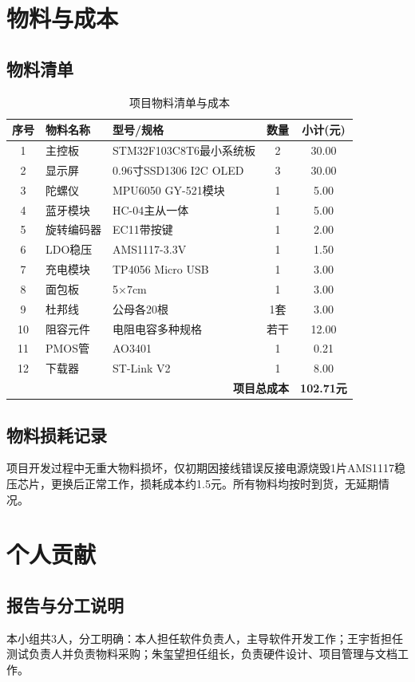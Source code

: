 \documentclass[12pt, a4paper]{ctexart}
\begin{document}
\section{物料与成本}
\subsection{物料清单}
\begin{table}[htbp]
\centering
\caption{项目物料清单与成本}
\label{tab:bom}
\begin{tabular}{cllcc}
\toprule
序号 & 物料名称 & 型号/规格 & 数量 & 小计(元) \\
\midrule
1 & 主控板 & STM32F103C8T6最小系统板 & 2 & 30.00 \\
2 & 显示屏 & 0.96寸SSD1306 I2C OLED & 3 & 30.00 \\
3 & 陀螺仪 & MPU6050 GY-521模块 & 1 & 5.00 \\
4 & 蓝牙模块 & HC-04主从一体 & 1 & 5.00 \\
5 & 旋转编码器 & EC11带按键 & 1 & 2.00 \\
6 & LDO稳压 & AMS1117-3.3V & 1 & 1.50 \\
7 & 充电模块 & TP4056 Micro USB & 1 & 3.00 \\
8 & 面包板 & 5×7cm & 1 & 3.00 \\
9 & 杜邦线 & 公母各20根 & 1套 & 3.00 \\
10 & 阻容元件 & 电阻电容多种规格 & 若干 & 12.00 \\
11 & PMOS管 & AO3401 & 1 & 0.21 \\
12 & 下载器 & ST-Link V2 & 1 & 8.00 \\
\midrule
\multicolumn{4}{r}{\textbf{项目总成本}} & \textbf{102.71元} \\
\bottomrule
\end{tabular}
\end{table}

\subsection{物料损耗记录}
项目开发过程中无重大物料损坏，仅初期因接线错误反接电源烧毁1片AMS1117稳压芯片，更换后正常工作，损耗成本约1.5元。所有物料均按时到货，无延期情况。

\section{个人贡献}
\subsection{报告与分工说明}
本小组共3人，分工明确：本人担任软件负责人，主导软件开发工作；王宇哲担任测试负责人并负责物料采购；朱玺望担任组长，负责硬件设计、项目管理与文档工作。
\end{document}
